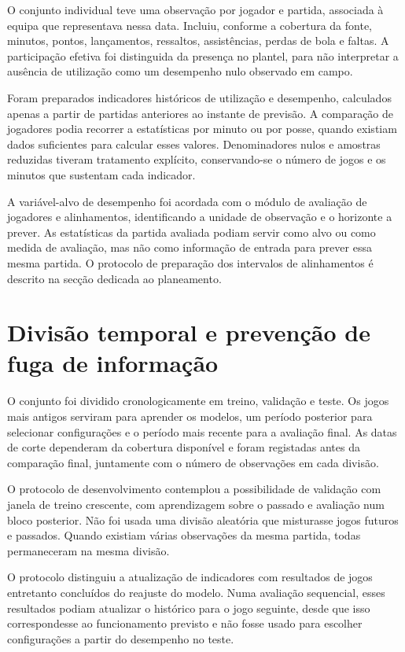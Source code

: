 O conjunto individual teve uma observação por jogador e partida, associada
à equipa que representava nessa data. Incluiu, conforme a cobertura da
fonte, minutos, pontos, lançamentos, ressaltos, assistências, perdas de
bola e faltas. A participação efetiva foi distinguida da presença no
plantel, para não interpretar a ausência de utilização como um desempenho
nulo observado em campo.

Foram preparados indicadores históricos de utilização e desempenho,
calculados apenas a partir de partidas anteriores ao instante de previsão.
A comparação de jogadores podia recorrer a estatísticas por minuto ou
por posse, quando existiam dados suficientes para calcular esses valores.
Denominadores nulos e amostras reduzidas tiveram tratamento explícito,
conservando-se o número de jogos e os minutos que sustentam cada indicador.

A variável-alvo de desempenho foi acordada com o módulo de avaliação de jogadores e alinhamentos, identificando
a unidade de observação e o horizonte a prever. As estatísticas da partida
avaliada podiam servir como alvo ou como medida de avaliação, mas não
como informação de entrada para prever essa mesma partida. O protocolo de preparação
dos intervalos de alinhamentos é descrito na secção dedicada ao planeamento.

\section{Divisão temporal e prevenção de fuga de informação}

O conjunto foi dividido cronologicamente em treino, validação e teste.
Os jogos mais antigos serviram para aprender os modelos, um período
posterior para selecionar configurações e o período mais recente para
a avaliação final. As datas de corte dependeram da cobertura disponível
e foram registadas antes da comparação final, juntamente com o número
de observações em cada divisão.

O protocolo de desenvolvimento contemplou a possibilidade de validação
com janela de treino crescente, com aprendizagem sobre o passado e
avaliação num bloco posterior. Não foi usada uma divisão aleatória que misturasse
jogos futuros e passados. Quando existiam várias observações da mesma
partida, todas permaneceram na mesma divisão.

O protocolo distinguiu a atualização de indicadores com resultados de
jogos entretanto concluídos do reajuste do modelo. Numa avaliação
sequencial, esses resultados podiam atualizar o histórico para o jogo
seguinte, desde que isso correspondesse ao funcionamento previsto e não
fosse usado para escolher configurações a partir do desempenho no teste.

